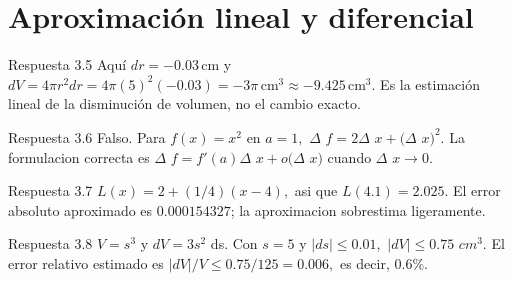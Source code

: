 \documentclass[10pt,a4paper,oneside,openany]{book}
\begin{document}
\section{Aproximación lineal y diferencial}
\begin{PSevenAnswerFixed}{Respuesta 3.5}
Aquí \(dr=-0.03\,\mathrm{cm}\) y \(dV=4\pi r^2dr=4\pi(5)^2(-0.03)=-3\pi\,\mathrm{cm}^3\approx-9.425\,\mathrm{cm}^3\). Es la estimación lineal de la disminución de volumen, no el cambio exacto.
\end{PSevenAnswerFixed}
\begin{PSevenAnswerFixed}{Respuesta 3.6}
Falso. Para \(f(x)=x^{2}\) en \(a=1,\) \(\Delta \) \(f=2\Delta \) \(x+(\Delta \) \(x)^{2}\). La formulacion correcta es \(\Delta \) \(f=f'(a)\Delta \) \(x+o(\Delta \) \(x)\) cuando \(\Delta \) \(x\to 0\).
\end{PSevenAnswerFixed}
\begin{PSevenAnswerFixed}{Respuesta 3.7}
\(L(x)=2+(1/4)(x-4),\) asi que \(L(4.1)=2.025\). El error absoluto aproximado es \(0.000154327\); la aproximacion sobrestima ligeramente.
\end{PSevenAnswerFixed}
\begin{PSevenAnswerFixed}{Respuesta 3.8}
\(V=s^{3}\) y \(dV=3s^{2}\) ds. Con \(s=5\) y \(|ds|\le 0.01,\) \(|dV|\le 0.75\) \(cm^{3}\). El error relativo estimado es \(|dV|/V\le 0.75/125=0.006,\) es decir, \(0.6\%\).
\end{PSevenAnswerFixed}
\end{document}
